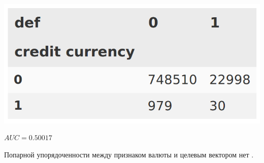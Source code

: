 \documentclass[russian, 10pt]{beamer}
\begin{document}
\begin{frame}

\includegraphics[scale=0.3]{images/currency.png}

\large
$AUC=0.50017$

Попарной упорядоченности между признаком валюты и целевым вектором нет	.

\end{frame}
\end{document}
